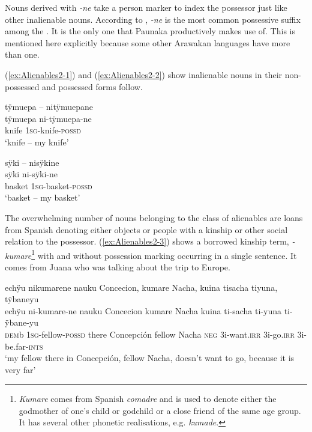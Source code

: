 Nouns derived with \textit{-ne} take a person marker to index the possessor just like other inalienable nouns. According to \citet[378]{Payne1991}, \textit{-ne} is the most common possessive suffix among the . It is the only one that Paunaka productively makes use of. This is mentioned here explicitly because some other Arawakan languages have more than one.

(\ref{ex:Alienables2-1}) and (\ref{ex:Alienables2-2}) show inalienable nouns in their non-possessed and possessed forms follow.%

\ea\label{ex:Alienables2-1}
\begingl 
\glpreamble tÿmuepa – nitÿmuepane\\
\gla tÿmuepa ni-tÿmuepa-ne\\ 
\glb knife 1\textsc{sg}-knife-\textsc{possd}\\ 
\glft ‘knife – my knife’
\endgl
\xe

\ea\label{ex:Alienables2-2}
\begingl 
\glpreamble sÿki – nisÿkine\\
\gla sÿki ni-sÿki-ne\\ 
\glb basket 1\textsc{sg}-basket-\textsc{possd}\\ 
\glft ‘basket – my basket’\\ 
\endgl
\xe


The overwhelming number of nouns belonging to the class of alienables are loans from Spanish denoting either objects or people with a kinship or other social relation to the possessor. (\ref{ex:Alienables2-3}) shows a borrowed kinship term, \textit{-kumare}\footnote{\textit{Kumare} comes from Spanish \textit{comadre} and is used to denote either the godmother of one’s child or godchild or a close friend of the same age group. It has several other phonetic realisations, e.g. \textit{kumade}.} with and without possession marking occurring in a single sentence. It comes from Juana who was talking about the trip to Europe.

\ea\label{ex:Alienables2-3}
\begingl 
\glpreamble echÿu nikumarene nauku Concecion, kumare Nacha, kuina tisacha tiyuna, tÿbaneyu\\
\gla echÿu ni-kumare-ne nauku Concecion kumare Nacha kuina ti-sacha ti-yuna ti-ÿbane-yu\\ 
\glb \textsc{dem}b 1\textsc{sg}-fellow-\textsc{possd} there Concepción fellow Nacha \textsc{neg} 3i-want.\textsc{irr} 3i-go.\textsc{irr} 3i-be.far-\textsc{ints}\\ 
\glft ‘my fellow there in Concepción, fellow Nacha, doesn’t want to go, because it is very far’\\ 
\endgl
\trailingcitation{[jxx-p120430l-1.175]}
\xe

